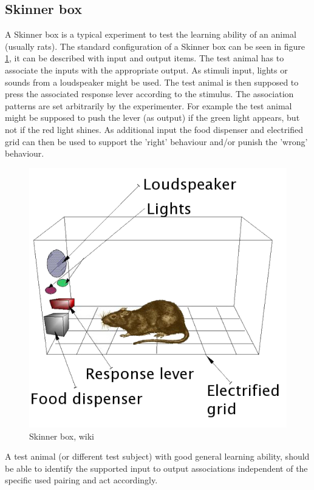 \documentclass[12pt,twoside]{article}
\theoremstyle{plain}
\theoremstyle{definition}
\theoremstyle{remark}
\begin{document}
\subsection{Skinner box}
A Skinner box is a typical experiment to test the learning ability of an animal (usually rats).
The standard configuration of a Skinner box can be seen in figure \ref{fig:skinner}, it can be described with input and output items.
The test animal has to associate the inputs with the	appropriate output.
As stimuli input, lights or sounds from a loudspeaker might be used. The test animal is then supposed to press the associated response lever according to the stimulus.
The association patterns are set arbitrarily by the experimenter. For example the test animal might be supposed to push the lever (as output) if the green light appears, but not if the red light shines.
As additional input the food dispenser and electrified grid can then be used to support the 'right' behaviour and/or punish the 'wrong' behaviour.

\begin{figure}[h]
	\begin{center}
		\includegraphics[width=.43\textwidth]{Skinner_box_scheme_01.png}
	\end{center}
	\caption{Skinner box, wiki}
	\label{fig:skinner}
\end{figure}

A test animal (or different test subject) with good general learning ability, should be able to identify the supported input to output associations independent of the specific used pairing and act accordingly.

\end{document}
